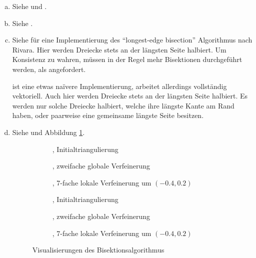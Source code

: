 \documentclass{myexercise}
\begin{document}
\begin{exercise}[Programmieraufgabe]
  \begin{enumerate}[a)]
    \item
      Siehe  und .
    \item
      Siehe .
    \item
      Siehe  für eine Implementierung des “longest-edge bisection” Algorithmus nach Rivara.
      Hier werden Dreiecke stets an der längsten Seite halbiert.
      Um Konsistenz zu wahren, müssen in der Regel mehr Bisektionen durchgeführt werden, als angefordert.

       ist eine etwas naïvere Implementierung, arbeitet allerdings vollständig vektoriell.
      Auch hier werden Dreiecke stets an der längsten Seite halbiert.
      Es werden nur solche Dreiecke halbiert, welche ihre längste Kante am Rand haben, oder paarweise eine gemeinsame längste Seite besitzen.
    \item
      Siehe  und Abbildung \ref{fig:vis}.

      \newlength\fheight
      \newlength\fwidth
      \begin{figure}[ht]
        \setlength{}
        \setlength{}
        \begin{subfigure}[t]{0.32\textwidth}
	   
	   \caption{, Initialtriangulierung}
        \end{subfigure}
        \begin{subfigure}[t]{0.32\textwidth}
	   
	   \caption{, zweifache globale Verfeinerung}
        \end{subfigure}
        \begin{subfigure}[t]{0.32\textwidth}
	   
	   \caption{, 7-fache lokale Verfeinerung um $(-0.4,0.2)$}
        \end{subfigure}

        \setlength{}
        \begin{subfigure}[t]{0.32\textwidth}
	   
	   \caption{, Initialtriangulierung}
        \end{subfigure}
        \begin{subfigure}[t]{0.32\textwidth}
	   
	   \caption{, zweifache globale Verfeinerung}
        \end{subfigure}
        \begin{subfigure}[t]{0.32\textwidth}
	   
	   \caption{, 7-fache lokale Verfeinerung um $(-0.4,0.2)$}
        \end{subfigure}
        \caption{Visualisierungen des Bisektionsalgorithmus}
        \label{fig:vis}
      \end{figure}
  \end{enumerate}
\end{exercise}
\end{document}

